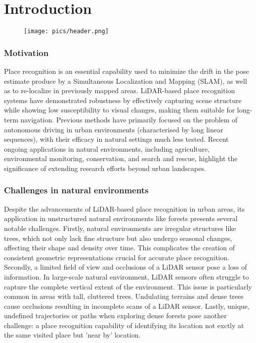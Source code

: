 \chapter{Introduction}
\label{chap:intro}

\begin{figure}
    \texttt{[image: pics/header.png]}
    \label{fig:motivation}
\end{figure}

\subsection*{Motivation}
Place recognition is an essential capability used to minimize the drift in the pose estimate produce by a Simultaneous Localization and Mapping (SLAM), as well as to re-localize in previously mapped areas. 
LiDAR-based place recognition systems have demonstrated robustness by effectively capturing scene structure while showing low susceptibility to visual changes, making them suitable for long-term navigation. 
Previous methods have primarily focused on the problem of autonomous driving in urban environments (characterised by long linear sequences), with their efficacy in natural settings much less tested.
Recent ongoing applications in natural environments, including agriculture, environmental monitoring, conservation, and search and rescue, highlight the significance of extending research efforts beyond urban landscapes.

\subsection*{Challenges in natural environments}
Despite the advancements of LiDAR-based place recognition in urban areas, its application in unstructured natural environments like forests presents several notable challenges. 
Firstly, natural environments are irregular structures like trees, which not only lack fine structure but also undergo seasonal changes, affecting their shape and density over time. This complicates the creation of consistent geometric representations crucial for accurate place recognition.
Secondly, a limited field of view and occlusions of a LiDAR sensor pose a loss of information. In large-scale natural environment, LiDAR sensors often struggle to capture the complete vertical extent of the environment. 
This issue is particularly common in areas with tall, cluttered trees.  Undulating terrains and dense trees cause occlusions resulting in incomplete scans of a LiDAR sensor. 
Lastly, unique, undefined trajectories or paths when exploring dense forests pose another challenge: a place recognition capability of identifying its location not exctly at the same visited place but 'near by' location. 


